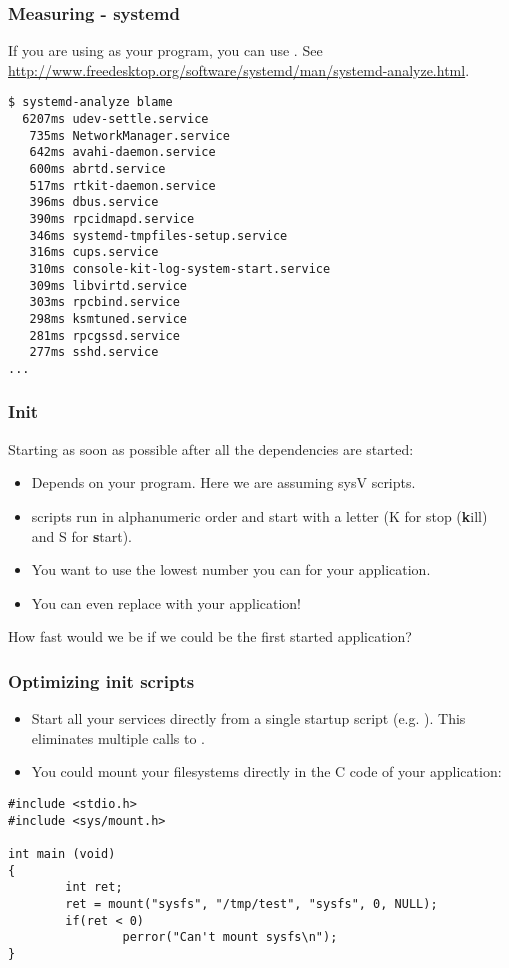\begin{frame}[fragile]
\frametitle{Measuring - systemd}
If you are using  as your  program, you can use
. See
\url{http://www.freedesktop.org/software/systemd/man/systemd-analyze.html}.\\
\begin{block}{}
\tiny
\begin{verbatim}
$ systemd-analyze blame
  6207ms udev-settle.service
   735ms NetworkManager.service
   642ms avahi-daemon.service
   600ms abrtd.service
   517ms rtkit-daemon.service
   396ms dbus.service
   390ms rpcidmapd.service
   346ms systemd-tmpfiles-setup.service
   316ms cups.service
   310ms console-kit-log-system-start.service
   309ms libvirtd.service
   303ms rpcbind.service
   298ms ksmtuned.service
   281ms rpcgssd.service
   277ms sshd.service
...
\end{verbatim}
\end{block}
\end{frame}

\begin{frame}
\frametitle{Init}
Starting as soon as possible after all the dependencies are started:
\begin{itemize}
	\item Depends on your  program. Here we are assuming sysV
	       scripts.
	\item {} scripts run in alphanumeric order and start with
	      a letter (K for stop ({\bf k}ill) and S for {\bf s}tart).
	\item You want to use the lowest number you can for your application.
	\item You can even replace  with your application!
\end{itemize}
How fast would we be if we could be the first started application?
\end{frame}

\begin{frame}[fragile]
\frametitle{Optimizing init scripts}
\begin{itemize}
	\item Start all your services directly from a single startup
	      script (e.g. ). This eliminates multiple
	      calls to .
	\item You could mount your filesystems directly in the C code
	      of your application:
\end{itemize}
\begin{block}{}
\begin{verbatim}
#include <stdio.h>
#include <sys/mount.h>

int main (void)
{
        int ret;
        ret = mount("sysfs", "/tmp/test", "sysfs", 0, NULL);
        if(ret < 0)
                perror("Can't mount sysfs\n");
}
\end{verbatim}
\end{block}
\end{frame}

